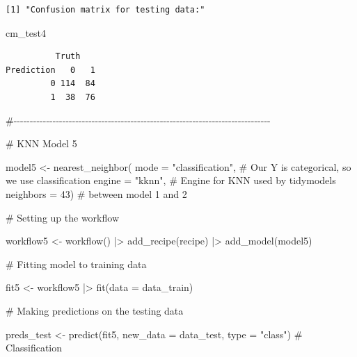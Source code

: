 \documentclass[
  letterpaper,
  DIV=11,
  numbers=noendperiod]{scrartcl}
\newenvironment{Shaded}{\begin{snugshade}}{\end{snugshade}}
\newcommand{\AttributeTok}[1]{\textcolor[rgb]{0.40,0.45,0.13}{#1}}
\newcommand{\CommentTok}[1]{\textcolor[rgb]{0.37,0.37,0.37}{#1}}
\newcommand{\DecValTok}[1]{\textcolor[rgb]{0.68,0.00,0.00}{#1}}
\newcommand{\FunctionTok}[1]{\textcolor[rgb]{0.28,0.35,0.67}{#1}}
\newcommand{\NormalTok}[1]{\textcolor[rgb]{0.00,0.23,0.31}{#1}}
\newcommand{\OtherTok}[1]{\textcolor[rgb]{0.00,0.23,0.31}{#1}}
\newcommand{\SpecialCharTok}[1]{\textcolor[rgb]{0.37,0.37,0.37}{#1}}
\newcommand{\StringTok}[1]{\textcolor[rgb]{0.13,0.47,0.30}{#1}}
\begin{document}
\begin{verbatim}
[1] "Confusion matrix for testing data:"
\end{verbatim}

\begin{Shaded}
\begin{Highlighting}[]
\NormalTok{cm\_test4}
\end{Highlighting}
\end{Shaded}

\begin{verbatim}
          Truth
Prediction   0   1
         0 114  84
         1  38  76
\end{verbatim}

\begin{Shaded}
\begin{Highlighting}[]
\CommentTok{\#{-}{-}{-}{-}{-}{-}{-}{-}{-}{-}{-}{-}{-}{-}{-}{-}{-}{-}{-}{-}{-}{-}{-}{-}{-}{-}{-}{-}{-}{-}{-}{-}{-}{-}{-}{-}{-}{-}{-}{-}{-}{-}{-}{-}{-}{-}{-}{-}{-}{-}{-}{-}{-}{-}{-}{-}{-}{-}{-}{-}{-}{-}{-}{-}{-}{-}{-}{-}{-}{-}{-}{-}{-}{-}{-}{-}{-}{-}{-}}

\CommentTok{\# KNN Model 5}

\NormalTok{model5 }\OtherTok{\textless{}{-}} \FunctionTok{nearest\_neighbor}\NormalTok{(}
  \AttributeTok{mode =} \StringTok{"classification"}\NormalTok{, }\CommentTok{\# Our Y is categorical, so we use classification}
  \AttributeTok{engine =} \StringTok{"kknn"}\NormalTok{, }\CommentTok{\# Engine for KNN used by tidymodels}
  \AttributeTok{neighbors =} \DecValTok{43}\NormalTok{) }\CommentTok{\# between model 1 and 2}


\CommentTok{\# Setting up the workflow}

\NormalTok{workflow5 }\OtherTok{\textless{}{-}} \FunctionTok{workflow}\NormalTok{() }\SpecialCharTok{|\textgreater{}}
  \FunctionTok{add\_recipe}\NormalTok{(recipe) }\SpecialCharTok{|\textgreater{}}
  \FunctionTok{add\_model}\NormalTok{(model5)}


\CommentTok{\# Fitting model to training data}

\NormalTok{fit5 }\OtherTok{\textless{}{-}}\NormalTok{ workflow5 }\SpecialCharTok{|\textgreater{}}
  \FunctionTok{fit}\NormalTok{(}\AttributeTok{data =}\NormalTok{ data\_train)}


\CommentTok{\# Making predictions on the testing data}

\NormalTok{preds\_test }\OtherTok{\textless{}{-}} \FunctionTok{predict}\NormalTok{(fit5, }
                      \AttributeTok{new\_data =}\NormalTok{ data\_test, }
                      \AttributeTok{type =} \StringTok{"class"}\NormalTok{) }\CommentTok{\# Classification}


\end{Highlighting}
\end{Shaded}
\end{document}

